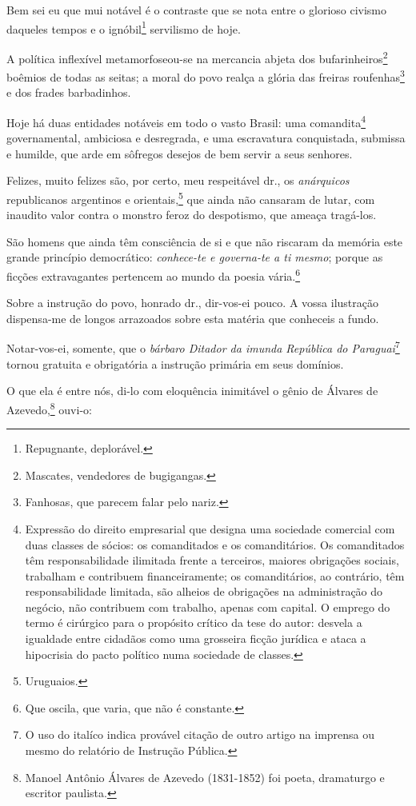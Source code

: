 Bem sei eu que mui notável é o contraste que se nota entre o glorioso
civismo daqueles tempos e o ignóbil\footnote{Repugnante, deplorável.}
servilismo de hoje.

A política inflexível metamorfoseou-se na mercancia abjeta dos
bufarinheiros\footnote{Mascates, vendedores de bugigangas.} boêmios de
todas as seitas; a moral do povo realça a glória das freiras
roufenhas\footnote{Fanhosas, que parecem falar pelo nariz.} e dos
frades barbadinhos.

Hoje há duas entidades notáveis em todo o vasto Brasil: uma
comandita\footnote{Expressão do direito empresarial que designa uma
  sociedade comercial com duas classes de sócios: os comanditados e os
  comanditários. Os comanditados têm responsabilidade ilimitada frente a
  terceiros, maiores obrigações sociais, trabalham e contribuem
  financeiramente; os comanditários, ao contrário, têm responsabilidade
  limitada, são alheios de obrigações na administração do negócio, não
  contribuem com trabalho, apenas com capital. O emprego do termo é
  cirúrgico para o propósito crítico da tese do autor: desvela a
  igualdade entre cidadãos como uma grosseira ficção jurídica e ataca a
  hipocrisia do pacto político numa sociedade de classes.}
governamental, ambiciosa e desregrada, e uma escravatura conquistada,
submissa e humilde, que arde em sôfregos desejos de bem servir a seus
senhores.

Felizes, muito felizes são, por certo, meu respeitável dr., os
\emph{anárquicos} republicanos argentinos e orientais,\footnote{
  Uruguaios.} que ainda não cansaram de lutar, com inaudito valor
contra o monstro feroz do despotismo, que ameaça tragá-los.

São homens que ainda têm consciência de si e que não riscaram da memória
este grande princípio democrático: \emph{conhece-te e governa-te a ti
mesmo}; porque as ficções extravagantes pertencem ao mundo da poesia
vária.\footnote{Que oscila, que varia, que não é constante.}

Sobre a instrução do povo, honrado dr., dir-vos-ei pouco. A vossa
ilustração dispensa-me de longos arrazoados sobre esta matéria que
conheceis a fundo.

Notar-vos-ei, somente, que o \emph{bárbaro Ditador da imunda República
do Paraguai}\footnote{O uso do italíco indica provável citação de
  outro artigo na imprensa ou mesmo do relatório de Instrução Pública.}
tornou gratuita e obrigatória a instrução primária em seus domínios.

O que ela é entre nós, di-lo com eloquência inimitável o gênio de
Álvares de Azevedo,\footnote{Manoel Antônio Álvares de Azevedo
  (1831-1852) foi poeta, dramaturgo e escritor paulista.} ouvi-o:

